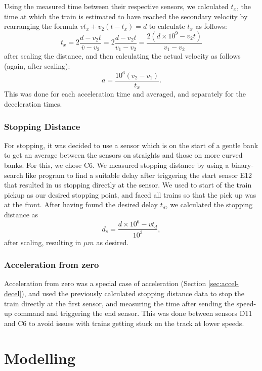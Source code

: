 \documentclass[12pt, titlepage]{article}
\begin{document}
    Using the measured time between their respective sensors, we calculated $t_x$, the time at which the train is estimated to have reached the secondary velocity by rearranging the formula $\overline{v} t_x + v_2(t - t_x) = d$ to calculate $t_x$ as follows:
    \[
        t_x = 2 \frac{d - v_2 t}{\overline{v} - v_2} = 2 \frac{d-v_2t}{v_1 - v_2} = \frac{2(d \times 10^9 -v_2t)}{v_1 - v_2}
    \]
    after scaling the distance, and then calculating the actual velocity as follows (again, after scaling):
    \[
        a = \frac{10^6(v_2 - v_1)}{t_x}.
    \]
    This was done for each acceleration time and averaged, and separately for the deceleration times.

    \subsubsection{Stopping Distance}
    
    For stopping, it was decided to use a sensor which is on the start of a gentle bank to get an average between the sensors on straights and those on more curved banks. For this, we chose C6. We measured stopping distance by using a binary-search like program to find a suitable delay after triggering the start sensor E12 that resulted in us stopping directly at the sensor. We used to start of the train pickup as our desired stopping point, and faced all trains so that the pick up was at the front. After having found the desired delay $t_d$, we calculated the stopping distance as
    \[
        d_s = \frac{d \times 10^6 - vt_d}{10^3},
    \]
    after scaling, resulting in $\mu m$ as desired.

    \subsubsection{Acceleration from zero}
    
    Acceleration from zero was a special case of acceleration (Section \ref{sec:accel-decel}), and used the previously calculated stopping distance data to stop the train  directly at the first sensor, and measuring the time after sending the speed-up command and triggering the end sensor. This was done between sensors D11 and C6 to avoid issues with trains getting stuck on the track at lower speeds.

    \section{Modelling}
    \label{sec:modelling}
    
\end{document}
